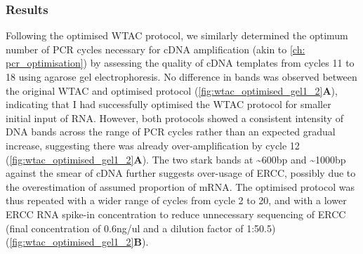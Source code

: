 \subsubsection{Results}
Following the optimised WTAC protocol, we similarly determined the optimum number of PCR cycles necessary for cDNA amplification (akin to \cref{ch: pcr_optimisation}) by assessing the quality of cDNA templates from cycles 11 to 18 using agarose gel electrophoresis. No difference in bands was observed between the original WTAC and optimised protocol (\cref{fig:wtac_optimised_gel1_2}\textbf{A}), indicating that I had successfully optimised the WTAC protocol for smaller initial input of RNA. However, both protocols showed a consistent intensity of DNA bands across the range of PCR cycles rather than an expected gradual increase, suggesting there was already over-amplification by cycle 12 (\cref{fig:wtac_optimised_gel1_2}\textbf{A}). The two stark bands at \textasciitilde600bp and \textasciitilde1000bp against the smear of cDNA further suggests over-usage of ERCC, possibly due to the overestimation of assumed proportion of mRNA. The optimised protocol was thus repeated with a wider range of cycles from cycle 2 to 20, and with a lower ERCC RNA spike-in concentration to reduce unnecessary sequencing of ERCC (final concentration of 0.6ng/ul and a dilution factor of 1:50.5) (\cref{fig:wtac_optimised_gel1_2}\textbf{B}). 
    
